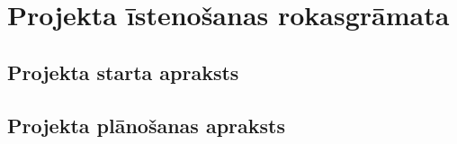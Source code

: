 \chapter{Projekta īstenošanas rokasgrāmata}
\section{Projekta starta apraksts}
  
  
  
  
  
  
\section{Projekta plānošanas apraksts}
  
  
  



